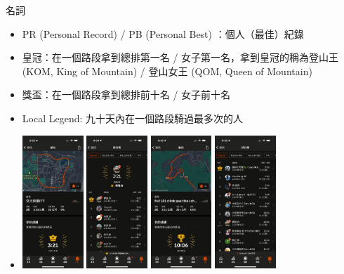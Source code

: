 \begin{frame}{名詞}
\begin{itemize}
\item PR (Personal Record) / PB (Personal Best) ：個人（最佳）紀錄
\item 皇冠：在一個路段拿到總排第一名 / 女子第一名，拿到皇冠的稱為登山王 (KOM, King of Mountain) / 登山女王 (QOM, Queen of Mountain)
\item 獎盃：在一個路段拿到總排前十名 / 女子前十名
\item Local Legend: 九十天內在一個路段騎過最多次的人
\item \includegraphics[height=5cm]{KOM.png}
\includegraphics[height=5cm]{KOM2.png}
\includegraphics[height=5cm]{trophy.png}
\includegraphics[height=5cm]{trophy2.png}

\end{itemize}
\end{frame}
